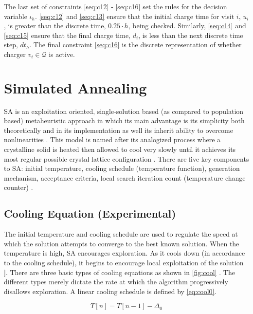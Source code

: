 \documentclass[11pt,a4paper,final]{article}
\newcommand{\Tau}{T}                        %
\newcommand{\Qset}{\mathcal{Q}}             %
\begin{document}
The last set of constraints \ref{seq:c12} - \ref{seq:c16} set the rules for the decision variable \(\iota_h\). \ref{seq:c12}
and \ref{seq:c13} ensure that the initial charge time for visit \(i\), \(u_i\), is greater than the discrete time, \(0.25 \cdot
h\), being checked. Similarly, \ref{seq:c14} and \ref{seq:c15} ensure that the final charge time, \(d_i\), is less than the
next discrete time step, \(dt_h\). The final constraint \ref{seq:c16} is the discrete representation of whether charger
\(v_i \in \Qset\) is active.
\section{Simulated Annealing}
\label{sec:simulated-annealing}
SA is an exploitation oriented, single-solution based (as compared to population based) metaheuristic approach in which
its main advantage is its simplicity both theoretically and in its implementation as well its inherit ability to
overcome nonlinearities \cite{gendreau-2018-handb-metah,radosavljevic-2018-metah-optim}. This model is named after its
analogized process where a crystalline solid is heated then allowed to cool very slowly until it achieves its most
regular possible crystal lattice configuration \cite{henderson-1989-theor-pract}. There are five key components to SA:
initial temperature, cooling schedule (temperature function), generation mechanism, acceptance criteria, local search
iteration count (temperature change counter) \cite{keller-2019-multi-objec}.

\subsection{Cooling Equation (Experimental)}
\label{cooling-equation-experimental}
The initial temperature and cooling schedule are used to regulate the speed at which the solution attempts to converge
to the best known solution. When the temperature is high, SA encourages exploration. As it cools down (in accordance to
the cooling schedule), it begins to encourage local exploitation of the solution
\cite{rutenbar-1989-simul-anneal-algor,henderson-1989-theor-pract}]. There are three basic types of cooling equations
as shown in \ref{fig:cool} \cite{keller-2019-multi-objec}. The different types merely dictate the rate at which the algorithm
progressively disallows exploration. A linear cooling schedule is defined by \ref{eq:cool0}.

\begin{equation}
\label{eq:cool0}
\Tau[n] = \Tau[n-1] - \Delta_0
\end{equation}
\end{document}
